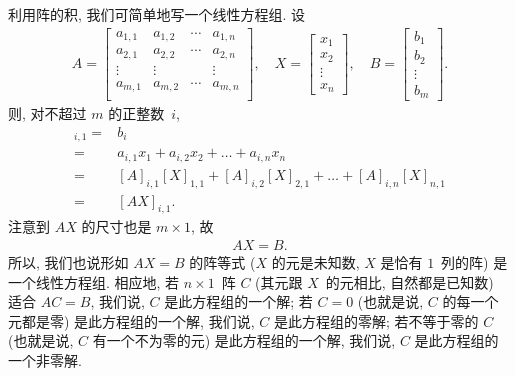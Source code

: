 利用阵的积, 我们可简单地写一个线性方程组.
设
\begin{align*}
    A =
    \begin{bmatrix}
        a_{1,1} & a_{1,2} & \cdots & a_{1,n} \\
        a_{2,1} & a_{2,2} & \cdots & a_{2,n} \\
        \vdots  & \vdots  & {}     & \vdots  \\
        a_{m,1} & a_{m,2} & \cdots & a_{m,n} \\
    \end{bmatrix},
    \quad
    X =
    \begin{bmatrix}
        x_1 \\ x_2 \\ \vdots \\ x_n
    \end{bmatrix},
    \quad
    B =
    \begin{bmatrix}
        b_1 \\ b_2 \\ \vdots \\ b_m
    \end{bmatrix}.
\end{align*}
则, 对不超过 \(m\) 的正整数~\(i\),
\begin{align*}
    [B]_{i,1}
    = {} &
    b_i
    \\
    = {} &
    a_{i,1} x_1 + a_{i,2} x_2 + \dots + a_{i,n} x_n
    \\
    = {} &
    [A]_{i,1} [X]_{1,1} + [A]_{i,2} [X]_{2,1}
    + \dots + [A]_{i,n} [X]_{n,1}
    \\
    = {} &
    [AX]_{i,1}.
\end{align*}
注意到 \(AX\) 的尺寸也是 \(m \times 1\), 故
\begin{align*}
    AX = B.
\end{align*}
所以, 我们也说形如 \(AX = B\) 的阵等式
(\(X\) 的元是未知数, \(X\) 是恰有 \(1\)~列的阵)
是一个线性方程组.
相应地, 若 \(n \times 1\)~阵 \(C\)
(其元跟 \(X\)~的元相比, 自然都是已知数)
适合 \(AC = B\),
我们说, \(C\) 是此方程组的一个解;
若 \(C = 0\)
(也就是说, \(C\) 的每一个元都是零)
是此方程组的一个解,
我们说, \(C\) 是此方程组的零解;
若不等于零的 \(C\)
(也就是说, \(C\) 有一个不为零的元)
是此方程组的一个解,
我们说, \(C\) 是此方程组的一个非零解.

